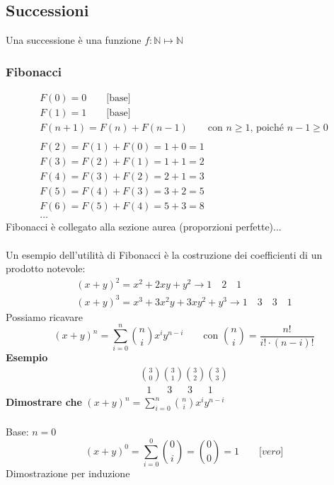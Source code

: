 \documentclass[italian]{article}
\begin{document}
\pagebreak
\subsection{Successioni}
Una successione è una funzione $f: \mathbb{N} \longmapsto \mathbb{N}$ 
\subsubsection{Fibonacci}
\begin{gather*}
	F(0) = 0 \qquad \text{[base]}\\
	F(1) = 1 \qquad \text{[base]}\\
	F(n+1) = F(n) + F(n-1) \qquad \text{con } n\geq 1 \text{, poiché $n-1\geq 0$}\\\\
	F(2) = F(1) + F(0) = 1 + 0 = 1 \\
	F(3) = F(2) + F(1) = 1 + 1 = 2 \\
	F(4) = F(3) + F(2) = 2 + 1 = 3 \\
	F(5) = F(4) + F(3) = 3 + 2 = 5 \\
	F(6) = F(5) + F(4) = 5 + 3 = 8 \\
	\dots
\end{gather*}
Fibonacci è collegato alla sezione aurea (proporzioni perfette)...\\\\
Un esempio dell'utilità di Fibonacci è la costruzione dei coefficienti di un prodotto notevole:
\begin{gather*}
	(x+y)^2 = x^2 + 2xy + y^2 \to 1 \quad 2 \quad 1\\
	(x+y)^3 = x^3 + 3x^2y + 3xy^2 + y^3 \to 1 \quad 3 \quad 3 \quad 1
\end{gather*}
Possiamo ricavare
\[
	(x+y)^n = \sum_{i=0}^{n}\binom{n}{i}x^iy^{n-i} \qquad \text{con } \binom{n}{i} = \dfrac{n!}{i!\cdot(n-i)!}
\]
\textbf{Esempio}\\
\begin{gather*}
	\binom{3}{0}\binom{3}{1}\binom{3}{2}\binom{3}{3}\\
	\;\;\, 1 \;\;\quad 3 \;\;\quad 3 \;\;\quad 1
\end{gather*}
\textbf{Dimostrare che} $(x+y)^n = \sum_{i=0}^{n}\binom{n}{i}x^iy^{n-i}$ \\\\
Base: $n=0$ 
\[
	(x+y)^0 = \sum_{i=0}^{0}\binom{0}{i}=\binom{0}{0} = 1 \qquad \textit{[vero]}
\]
Dimostrazione per induzione
\end{document}
